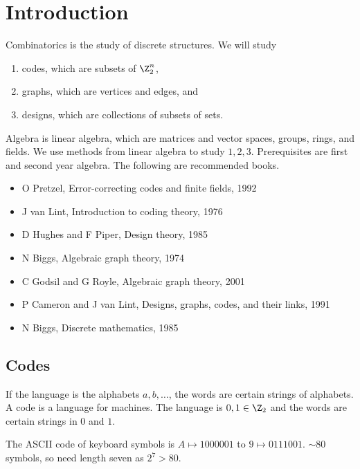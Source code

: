 





\section{Introduction}


Combinatorics is the study of discrete structures. We will study
\begin{enumerate}
\item codes, which are subsets of $ \Z_2^n $,
\item graphs, which are vertices and edges, and
\item designs, which are collections of subsets of sets.
\end{enumerate}
Algebra is linear algebra, which are matrices and vector spaces, groups, rings, and fields. We use methods from linear algebra to study $ 1, 2, 3 $. Prerequisites are first and second year algebra. The following are recommended books.
\begin{itemize}
\item O Pretzel, Error-correcting codes and finite fields, 1992
\item J van Lint, Introduction to coding theory, 1976
\item D Hughes and F Piper, Design theory, 1985
\item N Biggs, Algebraic graph theory, 1974
\item C Godsil and G Royle, Algebraic graph theory, 2001
\item P Cameron and J van Lint, Designs, graphs, codes, and their links, 1991
\item N Biggs, Discrete mathematics, 1985
\end{itemize}

\subsection{Codes}

If the language is the alphabets $ a, b, \dots $, the words are certain strings of alphabets. A code is a language for machines. The language is $ 0, 1 \in \Z_2 $ and the words are certain strings in $ 0 $ and $ 1 $.

\begin{example*}
The ASCII code of keyboard symbols is $ A \mapsto 1000001 $ to $ 9 \mapsto 0111001 $. $ \sim80 $ symbols, so need length seven as $ 2^7 > 80 $.
\end{example*}

